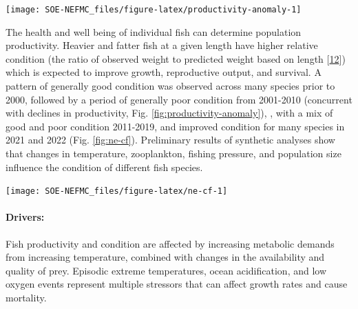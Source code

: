 \documentclass[
  10pt,
]{article}
\let\origfigure\figure
\let\endorigfigure\endfigure
\renewenvironment{figure}[1][2] {
    \expandafter\origfigure\expandafter[H]
} {
    \endorigfigure
}
\begin{document}
\begin{figure}

{\centering \texttt{[image: SOE-NEFMC\_files/figure-latex/productivity-anomaly-1]} 

}

\caption{Fish productivity measures. Left: Small fish per large fish survey biomass anomaly in the Mid-Atlantic Bight. Right: assessment recruitment per spawning stock biomass anomaly for stocks mainly in the Mid-Atlantic. The summed anomaly across species is shown by the black line, drawn across all years with the same number of stocks analyzed.}\label{fig:productivity-anomaly}
\end{figure}

The health and well being of individual fish can determine population productivity. Heavier and fatter fish at a given length have higher relative condition (the ratio of observed weight to predicted weight based on length {[}\protect\hyperlink{ref-le_cren_length-weight_1951}{12}{]}) which is expected to improve growth, reproductive output, and survival. A pattern of generally good condition was observed across many species prior to 2000, followed by a period of generally poor condition from 2001-2010 (concurrent with declines in productivity, Fig. \ref{fig:productivity-anomaly}), , with a mix of good and poor condition 2011-2019, and improved condition for many species in 2021 and 2022 (Fig. \ref{fig:ne-cf}). Preliminary results of synthetic analyses show that changes in temperature, zooplankton, fishing pressure, and population size influence the condition of different fish species.

\begin{figure}

{\centering \texttt{[image: SOE-NEFMC\_files/figure-latex/ne-cf-1]} 

}

\caption{Condition factor for fish species in New England based on fall NEFSC bottom trawl survey data. No survey was conducted in 2020.}\label{fig:ne-cf}
\end{figure}

\hypertarget{drivers-2}{%
\paragraph{Drivers:}\label{drivers-2}}

Fish productivity and condition are affected by increasing metabolic demands from increasing temperature, combined with changes in the availability and quality of prey. Episodic extreme temperatures, ocean acidification, and low oxygen events represent multiple stressors that can affect growth rates and cause mortality.
\end{document}
